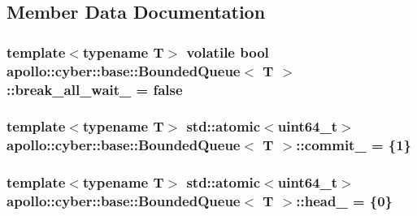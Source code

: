 \subsection{Member Data Documentation}
\hypertarget{classapollo_1_1cyber_1_1base_1_1BoundedQueue_a750b9ec4961d2e4da6b97cd79d866292}{
\subsubsection[{break\-\_\-all\-\_\-wait\-\_\-}]{\setlength{\rightskip}{0pt plus 5cm}template$<$typename T$>$ volatile bool {\bf apollo\-::cyber\-::base\-::\-Bounded\-Queue}$<$ T $>$\-::break\-\_\-all\-\_\-wait\-\_\- = false\hspace{0.3cm}{\ttfamily [private]}}}\label{classapollo_1_1cyber_1_1base_1_1BoundedQueue_a750b9ec4961d2e4da6b97cd79d866292}
\hypertarget{classapollo_1_1cyber_1_1base_1_1BoundedQueue_a8ea7d0921f586ec3bbd616967fe7f5a3}{
\subsubsection[{commit\-\_\-}]{\setlength{\rightskip}{0pt plus 5cm}template$<$typename T$>$ std\-::atomic$<$uint64\-\_\-t$>$ {\bf apollo\-::cyber\-::base\-::\-Bounded\-Queue}$<$ T $>$\-::commit\-\_\- = \{1\}\hspace{0.3cm}{\ttfamily [private]}}}\label{classapollo_1_1cyber_1_1base_1_1BoundedQueue_a8ea7d0921f586ec3bbd616967fe7f5a3}
\hypertarget{classapollo_1_1cyber_1_1base_1_1BoundedQueue_afcb7d1df454d64b1b480caf678af1a10}{
\subsubsection[{head\-\_\-}]{\setlength{\rightskip}{0pt plus 5cm}template$<$typename T$>$ std\-::atomic$<$uint64\-\_\-t$>$ {\bf apollo\-::cyber\-::base\-::\-Bounded\-Queue}$<$ T $>$\-::head\-\_\- = \{0\}\hspace{0.3cm}{\ttfamily [private]}}}\label{classapollo_1_1cyber_1_1base_1_1BoundedQueue_afcb7d1df454d64b1b480caf678af1a10}

